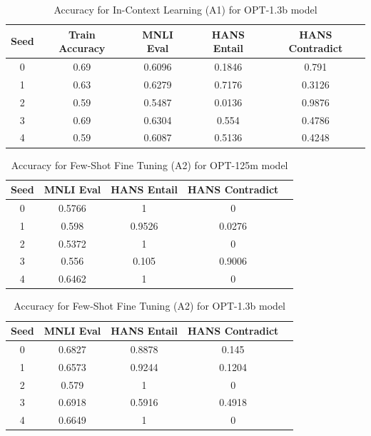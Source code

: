 \documentclass[10pt,twocolumn,letterpaper]{article}
\begin{document}
\begin{table}[h!]
\begin{center}
\begin{tabular}{|c|c|c|c|c|}
\hline
\textbf{Seed} & \textbf{Train Accuracy} & \textbf{MNLI Eval} & \textbf{HANS Entail} & \textbf{HANS Contradict} \\
\hline
\hline
0 & 0.69 & 0.6096 & 0.1846 & 0.791 \\
1 & 0.63 & 0.6279 & 0.7176 & 0.3126 \\
2 & 0.59 & 0.5487 & 0.0136 & 0.9876 \\
3 & 0.69 & 0.6304 & 0.554 & 0.4786 \\
4 & 0.59 & 0.6087 & 0.5136 & 0.4248 \\
\hline
\end{tabular}
\end{center}
\caption{Accuracy for In-Context Learning (A1) for OPT-1.3b model}
\end{table}


			
			

\begin{table}[h!]
\begin{center}
\begin{tabular}{|c|c|c|c|c|}
\hline
\textbf{Seed} & \textbf{MNLI Eval} & \textbf{HANS Entail} & \textbf{HANS Contradict} \\
\hline
\hline
0 & 0.5766 & 1 & 0 \\
1 & 0.598 & 0.9526 & 0.0276 \\
2 & 0.5372 & 1 & 0 \\
3 & 0.556 & 0.105 & 0.9006 \\
4 & 0.6462 & 1 & 0 \\
\hline
\end{tabular}
\end{center}
\caption{Accuracy for Few-Shot Fine Tuning (A2) for OPT-125m model}
\end{table}

\begin{table}[h!]
\begin{center}
\begin{tabular}{|c|c|c|c|c|}
\hline
\textbf{Seed} & \textbf{MNLI Eval} & \textbf{HANS Entail} & \textbf{HANS Contradict} \\
\hline
\hline
0 & 0.6827 & 0.8878 & 0.145 \\
1 & 0.6573 & 0.9244 & 0.1204 \\
2 & 0.579 & 1 & 0 \\
3 & 0.6918 & 0.5916 & 0.4918 \\
4 & 0.6649 & 1 & 0 \\
\hline
\end{tabular}
\end{center}
\caption{Accuracy for Few-Shot Fine Tuning (A2) for OPT-1.3b model}
\end{table}
\end{document}
